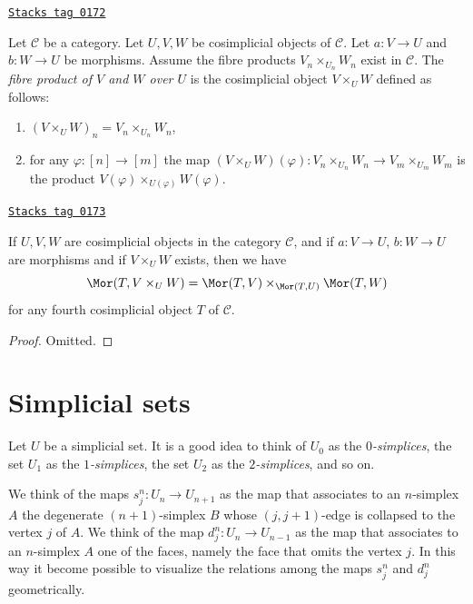 \begin{definition}
\label{simplicial-definition-fibre-product-cosimplicial-objects}
\href{https://stacks.math.columbia.edu/tag/0172}{\texttt{Stacks tag 0172}}

Let $\mathcal{C}$ be a category.
Let $U, V, W$ be cosimplicial objects of $\mathcal{C}$.
Let $a : V \to U$ and $b : W \to U$ be morphisms.
Assume the fibre products $V_n \times_{U_n} W_n$ exist in $\mathcal{C}$.
The {\it fibre product of $V$ and $W$ over $U$} is the cosimplicial object
$V \times_U W$ defined as follows:
\begin{enumerate}
\item $(V \times_U W)_n = V_n \times_{U_n} W_n$,
\item for any $\varphi : [n] \to [m]$ the map
$(V \times_U W)(\varphi) : V_n \times_{U_n} W_n \to V_m \times_{U_m} W_m$
is the product $V(\varphi) \times_{U(\varphi)} W(\varphi)$.
\end{enumerate}
\end{definition}

\begin{lemma}
\label{simplicial-lemma-fibre-product-cosimplicial-objects}
\href{https://stacks.math.columbia.edu/tag/0173}{\texttt{Stacks tag 0173}}

If $U, V, W$ are cosimplicial objects in the category $\mathcal{C}$,
and if $a : V \to U$, $b : W \to U$ are morphisms
and if $V \times_U W$ exists, then we have
$$
\Mor(T, V \times_U W) =
\Mor(T, V) \times_{\Mor(T, U)}
\Mor(T, W)
$$
for any fourth cosimplicial object $T$ of $\mathcal{C}$.
\end{lemma}

\begin{proof}
Omitted.
\end{proof}

\section{Simplicial sets}
\label{simplicial-section-simplicial-set}
Let $U$ be a simplicial set. It is a good idea to think of
$U_0$ as the {\it $0$-simplices}, the set $U_1$ as the
{\it $1$-simplices},
the set $U_2$ as the {\it $2$-simplices}, and so on.

\medskip\noindent
We think of the maps $s^n_j : U_n \to U_{n + 1}$ as
the map that associates to an $n$-simplex $A$ the degenerate
$(n + 1)$-simplex $B$ whose $(j, j + 1)$-edge is collapsed
to the vertex $j$ of $A$. We think of the map $d^n_j : U_n \to U_{n - 1}$
as the map that associates to an $n$-simplex $A$ one of the
faces, namely the face that omits the vertex $j$.
In this way it become possible to visualize the relations
among the maps $s^n_j$ and $d^n_j$ geometrically.

